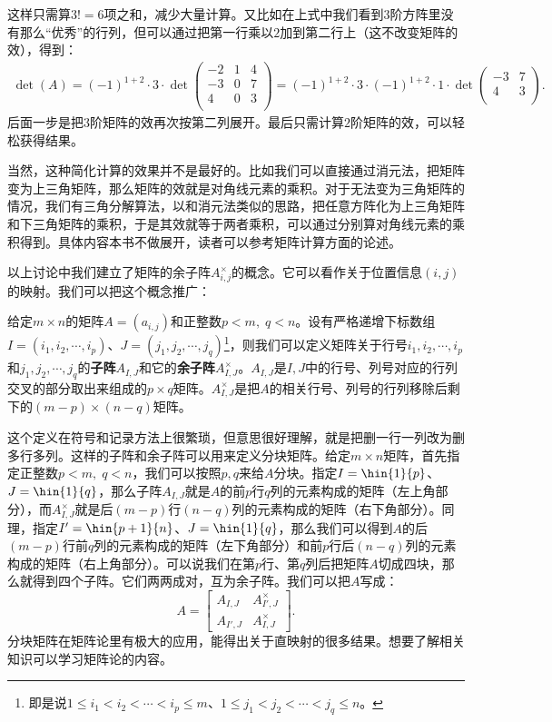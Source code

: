 \documentclass[12pt,UTF8]{ctexbook}
\begin{document}
这样只需算$3! = 6$项之和，减少大量计算。又比如在上式中我们看到$3$阶方阵里没有那么“优秀”的行列，但可以通过把第一行乘以$2$加到第二行上（这不改变矩阵的效），得到：
\begin{align*}
    \det(A) = (-1)^{1+2} \cdot 3\cdot \det\begin{pmatrix}
        -2      & 1 & 4 \\
        -3       & 0 & 7  \\
        4       & 0 & 3 \\
       \end{pmatrix} = (-1)^{1+2} \cdot 3\cdot (-1)^{1+2} \cdot 1\cdot \det\begin{pmatrix}
        -3  & 7  \\
        4   & 3 \\
       \end{pmatrix}.
\end{align*}
后面一步是把$3$阶矩阵的效再次按第二列展开。最后只需计算$2$阶矩阵的效，可以轻松获得结果。

当然，这种简化计算的效果并不是最好的。比如我们可以直接通过消元法，把矩阵变为上三角矩阵，那么矩阵的效就是对角线元素的乘积。对于无法变为三角矩阵的情况，我们有三角分解算法，以和消元法类似的思路，把任意方阵化为上三角矩阵和下三角矩阵的乘积，于是其效就等于两者乘积，可以通过分别算对角线元素的乘积得到。具体内容本书不做展开，读者可以参考矩阵计算方面的论述。

以上讨论中我们建立了矩阵的余子阵$A_{i,j}^{\times}$的概念。它可以看作关于位置信息$(i,j)$的映射。我们可以把这个概念推广：
\begin{df}
    给定$m\times n$的矩阵$A = (a_{i,j})$和正整数$p< m, \;q< n$。设有严格递增下标数组$I=(i_1,i_2,\cdots,i_p)$、$J=(j_1,j_2,\cdots,j_q)$\footnote{即是说$1\leqslant i_1<i_2<\cdots<i_p\leqslant m$、$1\leqslant j_1<j_2<\cdots<j_q\leqslant n$。}，则我们可以定义矩阵关于行号$i_1,i_2,\cdots,i_p$和$j_1,j_2,\cdots,j_q$的\textbf{子阵}$A_{I,J}$和它的\textbf{余子阵}$A_{I,J}^{\times}$。$A_{I,J}$是$I,J$中的行号、列号对应的行列交叉的部分取出来组成的$p\times q$矩阵。$A_{I,J}^{\times}$是把$A$的相关行号、列号的行列移除后剩下的$(m-p)\times(n-q)$矩阵。
\end{df}
这个定义在符号和记录方法上很繁琐，但意思很好理解，就是把删一行一列改为删多行多列。这样的子阵和余子阵可以用来定义分块矩阵。给定$m\times n$矩阵，首先指定正整数$p< m, \;q< n$，我们可以按照$p,q$来给$A$分块。指定$I=\hin{1}{p}$、$J=\hin{1}{q}$，那么子阵$A_{I,J}$就是$A$的前$p$行$q$列的元素构成的矩阵（左上角部分），而$A_{I,J}^{\times}$就是后$(m-p)$行$(n-q)$列的元素构成的矩阵（右下角部分）。同理，指定$I'=\hin{p+1}{n}$、$J=\hin{1}{q}$，那么我们可以得到$A$的后$(m-p)$行前$q$列的元素构成的矩阵（左下角部分）和前$p$行后$(n-q)$列的元素构成的矩阵（右上角部分）。可以说我们在第$p$行、第$q$列后把矩阵$A$切成四块，那么就得到四个子阵。它们两两成对，互为余子阵。我们可以把$A$写成：
$$
A = \begin{bmatrix}
    A_{I,J} & A_{I',J}^{\times} \\ A_{I',J} &  A_{I,J}^{\times}
\end{bmatrix}.
$$
分块矩阵在矩阵论里有极大的应用，能得出关于直映射的很多结果。想要了解相关知识可以学习矩阵论的内容。
\end{document}
